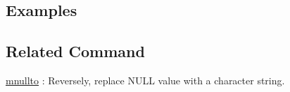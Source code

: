 \subsection*{Examples}

\subsection*{Related Command}
\hyperref[sect:mnullto]{mnullto} : Reversely, replace NULL value with a character string.

%
